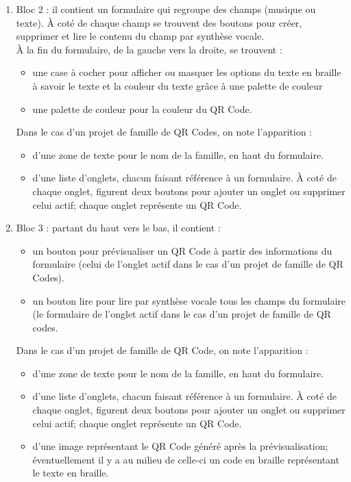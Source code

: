 \begin{enumerate}
\item Bloc 2 : il contient un formulaire qui regroupe des champs (musique ou texte). À coté de chaque champ se trouvent des boutons pour créer, supprimer et lire le contenu du champ par synthèse vocale.\\
À la fin du formulaire, de la gauche vers la droite, se trouvent :
	\begin{itemize}
	\item une case à cocher pour afficher ou masquer les options du texte en braille à savoir le texte et la couleur du texte grâce à une palette de couleur
	\item une palette de couleur pour la couleur du QR Code.
	\end{itemize}
Dans le cas d'un projet de famille de QR Codes, on note l'apparition :
	\begin{itemize}
	\item d'une zone de texte pour le nom de la famille, en haut du formulaire.
	\item d'une liste d'onglets, chacun faisant référence à un formulaire. À coté de chaque onglet, figurent deux boutons pour ajouter un onglet ou supprimer celui actif; chaque onglet représente un QR Code.
	\end{itemize}
	
\item Bloc 3 : partant du haut vers le bas, il contient : 
	\begin{itemize}
	\item un bouton pour prévisualiser un QR Code à partir des informations du formulaire (celui de l'onglet actif dans le cas d'un projet de famille de QR Codes).
	\item un bouton lire pour lire par synthèse vocale tous les champs du formulaire (le formulaire de l'onglet actif dans le cas d'un projet de famille de QR codes.
	\end{itemize}
Dans le cas d'un projet de famille de QR Code, on note l'apparition :
	\begin{itemize}
	\item d'une zone de texte pour le nom de la famille, en haut du formulaire.
	\item d'une liste d'onglets, chacun faisant référence à un formulaire. À coté de chaque onglet, figurent deux boutons pour ajouter un onglet ou supprimer celui actif; chaque onglet représente un QR Code.
		\item d'une image représentant le QR Code généré après la prévisualisation; éventuellement il y a au milieu de celle-ci un code en braille représentant le texte en braille.
	\end{itemize}
\end{enumerate}
